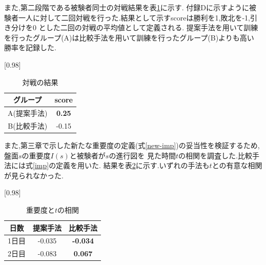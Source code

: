 \begin{table}[H]
    \caption{先読み手数制限なしの場合}
    \scriptsize
    \centering
    \label{table:system-100}
\end{table}
また,第二段階である被験者同士の対戦結果を表\ref{table:result-battle}に示す.
付録Dに示すように被験者一人に対して二回対戦を行った.結果として示すscoreは勝利を1,敗北を-1,引き分けを0
とした二回の対戦の平均値として定義される.
提案手法を用いて訓練を行ったグループ(A)は比較手法を用いて訓練を行ったグループ(B)よりも高い
勝率を記録した.
\begin{table}[H]
	\caption{対戦の結果}
    \label{table:result-battle}
	\centering
	\scalebox{0.98}[0.98]{
		\begin{tabular}{c|c}
			グループ & score \\ \hline
			A(提案手法)    & \bf{0.25} \\ 
			B(比較手法)    & -0.15 \\
		\end{tabular}
	}
	
\end{table}
また,第三章で示した新たな重要度の定義(式\ref{new-imp})の妥当性を検証するため,盤面$s$の重要度$I(s)$と被験者が$s$の進行図を
見た時間$t$の相関を調査した.比較手法には式\ref{imp}の定義を用いた.
結果を表\ref{table:result-imp}に示す.いずれの手法も$t$との有意な相関が見られなかった.
\begin{table}[H]
	\caption{重要度と$t$の相関}
    \label{table:result-imp}
	\centering
	\scalebox{0.98}[0.98]{
		\begin{tabular}{c|c|c}
			日数& 提案手法 & 比較手法 \\ \hline
			1日目& {-0.035}& \bf{-0.034}\\
            2日目& {-0.083}& \bf{0.067}\\
		\end{tabular}
	}
	
\end{table}


